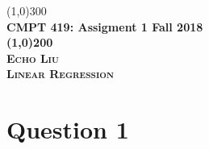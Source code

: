 \documentclass{article}
\begin{document}


\begin{titlepage}

   \begin{center}

   \line(1,0){300}\\
   [0.25in]
   \huge\bfseries CMPT 419: Assigment 1 Fall 2018\\
   [2mm]
   \line(1,0){200}\\
   [1.5cm]
   \textsc{Echo Liu}\\
   [0.75cm]
   \textsc{Linear Regression}\\
   \end{center}

\end{titlepage}

\section{Question 1}\label{sec:question1}
\end{document}
